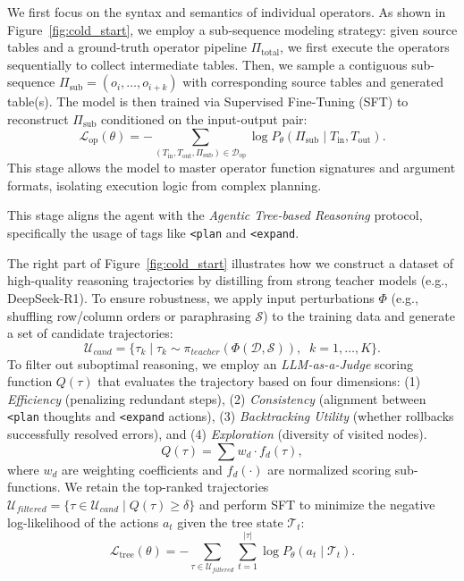 We first focus on the syntax and semantics of individual operators.
As shown in Figure~\ref{fig:cold_start}, we employ a sub-sequence modeling strategy: given source tables and a ground-truth operator pipeline $\Pi_{\text{total}}$, we first execute the operators sequentially to collect intermediate tables. Then, we sample a contiguous sub-sequence $\Pi_{\text{sub}} = (o_i, \dots, o_{i+k})$ with corresponding source tables and generated table(s). 
The model is then trained via Supervised Fine-Tuning (SFT) to reconstruct $\Pi_{\text{sub}}$ conditioned on the input-output pair:
$$
\mathcal{L}_{\text{op}}(\theta) 
= - \sum_{(T_{\text{in}}, T_{\text{out}}, \Pi_{\text{sub}}) \in \mathcal{D}_{\text{op}}}
\log P_\theta(\Pi_{\text{sub}} \mid T_{\text{in}}, T_{\text{out}}).
$$
This stage allows the model to master operator function signatures and argument formats, isolating execution logic from complex planning.

This stage aligns the agent with the \textit{Agentic Tree-based Reasoning} protocol, specifically the usage of tags like \texttt{<plan} and \texttt{<expand}.

The right part of Figure~\ref{fig:cold_start} illustrates how we construct a dataset of high-quality reasoning trajectories by distilling from strong teacher models (e.g., DeepSeek-R1).
To ensure robustness, we apply input perturbations $\Phi$ (e.g., shuffling row/column orders or paraphrasing $\mathcal{S}$) to the training data and generate a set of candidate trajectories:
$$
\mathcal{U}_{cand} = \{\tau_k \mid \tau_k \sim \pi_{teacher}(\Phi(\mathcal{D}, \mathcal{S})), \;\; k=1,\dots,K\}.
$$
To filter out suboptimal reasoning, we employ an \textit{LLM-as-a-Judge} scoring function $Q(\tau)$ that evaluates the trajectory based on four dimensions: (1) \textit{Efficiency} (penalizing redundant steps), (2) \textit{Consistency} (alignment between \texttt{<plan} thoughts and \texttt{<expand} actions), (3) \textit{Backtracking Utility} (whether rollbacks successfully resolved errors), and (4) \textit{Exploration} (diversity of visited nodes).
$$
Q(\tau) = \sum w_d \cdot f_d(\tau),
$$
where $w_d$ are weighting coefficients and $f_d(\cdot)$ are normalized scoring sub-functions.
We retain the top-ranked trajectories $\mathcal{U}_{filtered} = \{\tau \in \mathcal{U}_{cand} \mid Q(\tau) \ge \delta\}$ and perform SFT to minimize the negative log-likelihood of the actions $a_t$ given the tree state $\mathcal{T}_t$:
$$
\mathcal{L}_{\text{tree}}(\theta)
= - \sum_{\tau \in \mathcal{U}_{filtered}}
\sum_{t=1}^{|\tau|} \log P_\theta(a_t \mid \mathcal{T}_t).
$$

